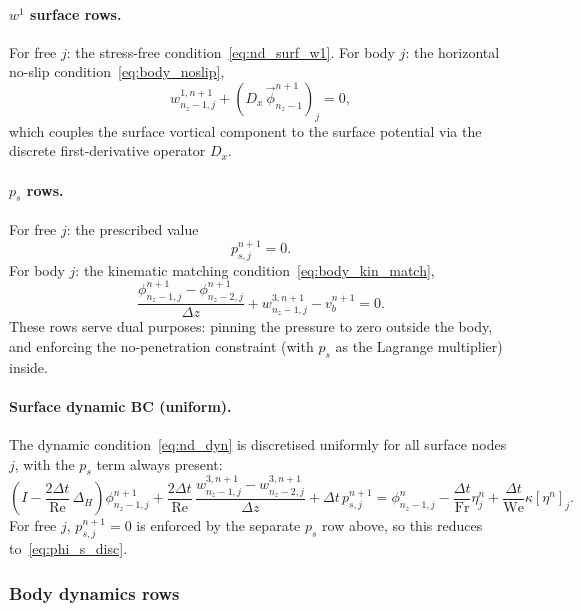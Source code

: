 \documentclass{article}
\newcommand{\Fr}{\mathrm{Fr}}
\newcommand{\We}{\mathrm{We}}
\newcommand{\Rey}{\mathrm{Re}}
\begin{document}
\paragraph{$w^1$ surface rows.}
For free $j$: the stress-free condition~\eqref{eq:nd_surf_w1}.
For body $j$: the horizontal no-slip condition~\eqref{eq:body_noslip},
\begin{equation}
    w^{1,n+1}_{n_z-1,j} + \left(D_x\,\vec{\phi}_{n_z-1}^{n+1}\right)_j = 0,
\end{equation}
which couples the surface vortical component to the surface potential via the discrete first-derivative operator $D_x$.

\paragraph{$p_s$ rows.}
For free $j$: the prescribed value
\begin{equation}
    p_{s,j}^{n+1} = 0.
\end{equation}
For body $j$: the kinematic matching condition~\eqref{eq:body_kin_match},
\begin{equation}
    \frac{\phi_{n_z-1,j}^{n+1} - \phi_{n_z-2,j}^{n+1}}{\Delta z} + w^{3,n+1}_{n_z-1,j} - v_b^{n+1} = 0.
\end{equation}
These rows serve dual purposes: pinning the pressure to zero outside the body, and enforcing the no-penetration constraint (with $p_s$ as the Lagrange multiplier) inside.

\paragraph{Surface dynamic BC (uniform).}
The dynamic condition~\eqref{eq:nd_dyn} is discretised uniformly for all surface nodes $j$, with the $p_s$ term always present:
\begin{equation}
    \left(I - \frac{2\Delta t}{\Rey}\,\Delta_H\right)\phi_{n_z-1,j}^{n+1} + \frac{2\Delta t}{\Rey}\,\frac{w^{3,n+1}_{n_z-1,j} - w^{3,n+1}_{n_z-2,j}}{\Delta z} + \Delta t\, p_{s,j}^{n+1} = \phi_{n_z-1,j}^n - \frac{\Delta t}{\Fr}\eta_j^n + \frac{\Delta t}{\We}\kappa[\eta^n]_j.
\end{equation}
For free $j$, $p_{s,j}^{n+1} = 0$ is enforced by the separate $p_s$ row above, so this reduces to~\eqref{eq:phi_s_disc}.

\subsubsection{Body dynamics rows}
\end{document}
